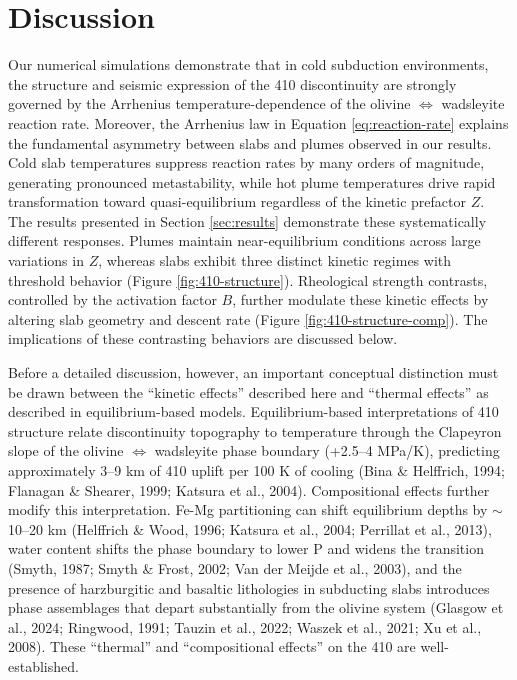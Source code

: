 \documentclass[draft,linenumbers]{agujournal2019}
\begin{document}
\section{Discussion}\label{sec:discussion}

Our numerical simulations demonstrate that in cold subduction
environments, the structure and seismic expression of the 410
discontinuity are strongly governed by the Arrhenius
temperature-dependence of the olivine \(\Leftrightarrow\) wadsleyite
reaction rate. Moreover, the Arrhenius law in Equation
\ref{eq:reaction-rate} explains the fundamental asymmetry between slabs
and plumes observed in our results. Cold slab temperatures suppress
reaction rates by many orders of magnitude, generating pronounced
metastability, while hot plume temperatures drive rapid transformation
toward quasi-equilibrium regardless of the kinetic prefactor \(Z\). The
results presented in Section \ref{sec:results} demonstrate these
systematically different responses. Plumes maintain near-equilibrium
conditions across large variations in \(Z\), whereas slabs exhibit three
distinct kinetic regimes with threshold behavior (Figure
\ref{fig:410-structure}). Rheological strength contrasts, controlled by
the activation factor \(B\), further modulate these kinetic effects by
altering slab geometry and descent rate (Figure
\ref{fig:410-structure-comp}). The implications of these contrasting
behaviors are discussed below.

Before a detailed discussion, however, an important conceptual
distinction must be drawn between the ``kinetic effects'' described here
and ``thermal effects'' as described in equilibrium-based models.
Equilibrium-based interpretations of 410 structure relate discontinuity
topography to temperature through the Clapeyron slope of the olivine
\(\Leftrightarrow\) wadsleyite phase boundary (+2.5--4 MPa/K),
predicting approximately 3--9 km of 410 uplift per 100 K of cooling
(Bina \& Helffrich, 1994; Flanagan \& Shearer, 1999; {Katsura et al.},
2004). Compositional effects further modify this interpretation. Fe-Mg
partitioning can shift equilibrium depths by \(\sim\) 10--20 km
(Helffrich \& Wood, 1996; {Katsura et al.}, 2004; Perrillat et al.,
2013), water content shifts the phase boundary to lower P and widens the
transition (Smyth, 1987; Smyth \& Frost, 2002; Van der Meijde et al.,
2003), and the presence of harzburgitic and basaltic lithologies in
subducting slabs introduces phase assemblages that depart substantially
from the olivine system (Glasgow et al., 2024; Ringwood, 1991; Tauzin et
al., 2022; Waszek et al., 2021; Xu et al., 2008). These ``thermal'' and
``compositional effects'' on the 410 are well-established.
\end{document}
